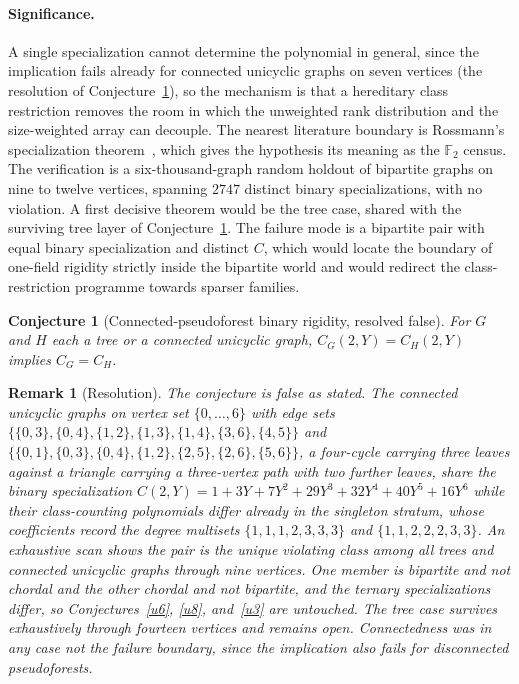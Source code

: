 \documentclass[11pt]{article}
\newtheorem{conjecture}{Conjecture}
\newtheorem{remark}{Remark}
\theoremstyle{definition}
\newcommand{\Fq}{\mathbb F}
\begin{document}
\paragraph{Significance.}
A single specialization cannot determine the polynomial in general, since the implication fails already for connected unicyclic graphs on seven vertices (the resolution of Conjecture~\ref{u7}), so the mechanism is that a hereditary class restriction removes the room in which the unweighted rank distribution and the size-weighted array can decouple.  The nearest literature boundary is Rossmann's specialization theorem~\cite{Ros22}, which gives the hypothesis its meaning as the $\Fq_2$ census.  The verification is a six-thousand-graph random holdout of bipartite graphs on nine to twelve vertices, spanning $2747$ distinct binary specializations, with no violation.  A first decisive theorem would be the tree case, shared with the surviving tree layer of Conjecture~\ref{u7}.  The failure mode is a bipartite pair with equal binary specialization and distinct $C$, which would locate the boundary of one-field rigidity strictly inside the bipartite world and would redirect the class-restriction programme towards sparser families.


\begin{conjecture}[Connected-pseudoforest binary rigidity, resolved false]\label{u7}
For $G$ and $H$ each a tree or a connected unicyclic graph, $C_G(2,Y)=C_H(2,Y)$ implies $C_G=C_H$.
\end{conjecture}

\begin{remark}[Resolution]\label{u7:res}
The conjecture is false as stated.  The connected unicyclic graphs on vertex set $\{0,\ldots,6\}$ with edge sets $\{\{0,3\},\{0,4\},\{1,2\},\{1,3\},\{1,4\},\{3,6\},\{4,5\}\}$ and $\{\{0,1\},\{0,3\},\{0,4\},\{1,2\},\{2,5\},\{2,6\},\{5,6\}\}$, a four-cycle carrying three leaves against a triangle carrying a three-vertex path with two further leaves, share the binary specialization $C(2,Y)=1+3Y+7Y^2+29Y^3+32Y^4+40Y^5+16Y^6$ while their class-counting polynomials differ already in the singleton stratum, whose coefficients record the degree multisets $\{1,1,1,2,3,3,3\}$ and $\{1,1,2,2,2,3,3\}$.  An exhaustive scan shows the pair is the unique violating class among all trees and connected unicyclic graphs through nine vertices.  One member is bipartite and not chordal and the other chordal and not bipartite, and the ternary specializations differ, so Conjectures~\ref{u6}, \ref{u8}, and~\ref{u3} are untouched.  The tree case survives exhaustively through fourteen vertices and remains open.  Connectedness was in any case not the failure boundary, since the implication also fails for disconnected pseudoforests.
\end{remark}
\end{document}
